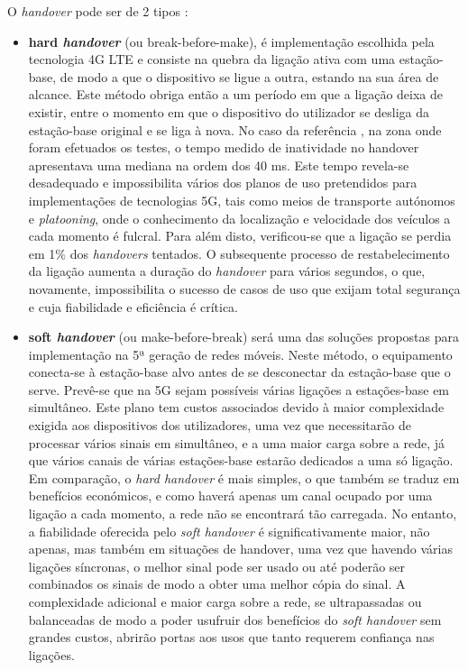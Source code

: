 \documentclass{llncs}
\begin{document}
O \textit{handover} pode ser de 2 tipos :
\begin{itemize}
	\item \textbf{hard \textit{handover}} (ou break-before-make), é implementação escolhida pela tecnologia 4G LTE e consiste na quebra da ligação ativa com uma estação-base, de modo a que o dispositivo se ligue a outra, estando na sua área de alcance. Este método obriga então a um período em que a ligação deixa de existir, entre o momento em que o dispositivo do utilizador se desliga da estação-base original e se liga à nova. No caso da referência \cite{magazine}, na zona onde foram efetuados os testes, o tempo medido de inatividade no handover apresentava uma mediana na ordem dos 40 ms. Este tempo revela-se desadequado e impossibilita vários dos planos de uso pretendidos para implementações de tecnologias 5G, tais como meios de transporte autónomos e \textit{platooning}, onde o conhecimento da localização e velocidade dos veículos a cada momento é fulcral. Para além disto, verificou-se que a ligação se perdia em 1\% dos \textit{handovers} tentados. O subsequente processo de restabelecimento da ligação aumenta a duração do \textit{handover} para vários segundos, o que, novamente, impossibilita o sucesso de casos de uso que exijam total segurança e cuja fiabilidade e eficiência é crítica.
	\item \textbf{soft \textit{handover}} (ou make-before-break) será uma das soluções propostas para implementação na 5ª geração de redes móveis. Neste método, o equipamento conecta-se à estação-base alvo antes de se desconectar da estação-base que o serve. Prevê-se que na 5G sejam possíveis várias ligações a estações-base em simultâneo. Este plano tem custos associados devido à maior complexidade exigida aos dispositivos dos utilizadores, uma vez que necessitarão de processar vários sinais em simultâneo, e a uma maior carga sobre a rede, já que vários canais de várias estações-base estarão dedicados a uma só ligação. Em comparação, o \textit{hard handover} é mais simples, o que também se traduz em benefícios económicos, e como haverá apenas um canal ocupado por uma ligação a cada momento, a rede não se encontrará tão carregada. No entanto, a fiabilidade oferecida pelo \textit{soft handover} é significativamente maior, não apenas, mas também em situações de handover, uma vez que havendo várias ligações síncronas, o melhor sinal pode ser usado ou até poderão ser combinados os sinais de modo a obter uma melhor cópia do sinal. A complexidade adicional e maior carga sobre a rede, se ultrapassadas ou balanceadas de modo a poder usufruir dos benefícios do \textit{soft handover} sem grandes custos, abrirão portas aos usos que tanto requerem confiança nas ligações.
\end{itemize}
\end{document}
